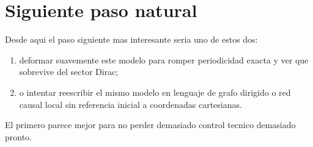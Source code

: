 \section{Siguiente paso natural}
Desde aqui el paso siguiente mas interesante seria uno de estos dos:
\begin{enumerate}[label=\arabic*.]
    \item deformar suavemente este modelo para romper periodicidad exacta y ver que sobrevive del sector Dirac;
    \item o intentar reescribir el mismo modelo en lenguaje de grafo dirigido o red causal local sin referencia inicial a coordenadas cartesianas.
\end{enumerate}

El primero parece mejor para no perder demasiado control tecnico demasiado pronto.

